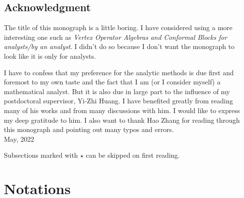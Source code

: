 \documentclass[12pt,a4paper,notitlepage]{article}
\theoremstyle{definition}
\theoremstyle{plain}
\numberwithin{equation}{section}
\begin{document}
\subsection*{Acknowledgment}


The title of this monograph is a little boring. I have considered using a more interesting one such as \emph{Vertex Operator Algebras and Conformal Blocks for analysts/by an analyst}. I didn't do so because I don't want the monograph to look like it is only for analysts. 




I have to confess that my preference for the analytic methods is due first and foremost to my own taste and the fact that I am (or I consider myself) a mathematical analyst. But it is also due in large part to the influence of my postdoctoral supervisor, Yi-Zhi Huang. I have benefited greatly from reading many of his works and from many discussions with him. I would like to express my deep gratitude to him. I also want to thank Hao Zhang for reading through this monograph and pointing out many typos and errors.\\[2ex]

\hfill May, 2022









 




 





 












\newpage
	
Subsections marked with $\star$ can be skipped on first reading.

\section{Notations}
\end{document}
